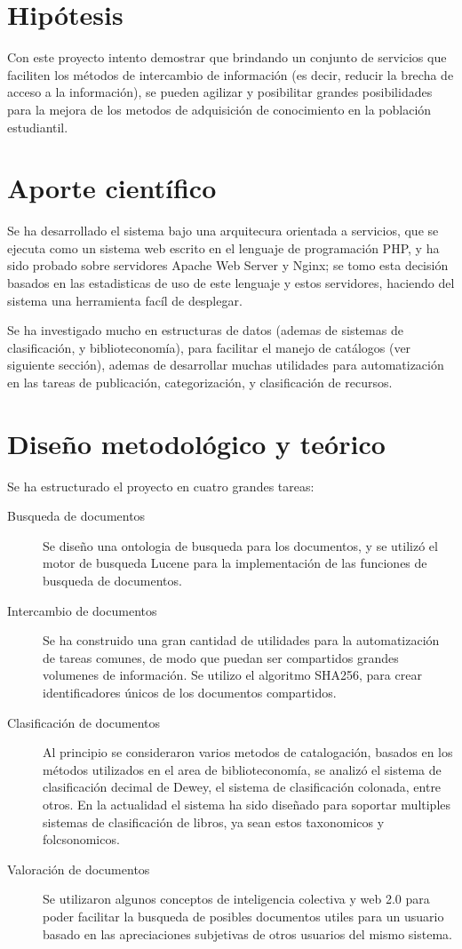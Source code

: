 \documentclass[letter,11pt,oneside,spanish]{article}
\begin{document}
\section{Hipótesis}
Con este proyecto intento demostrar que brindando un conjunto de servicios que
faciliten los métodos de intercambio de información (es decir, reducir la brecha
de acceso a la información), se pueden agilizar y posibilitar grandes
posibilidades para la mejora de los metodos de adquisición de conocimiento en la
población estudiantil.

\section{Aporte científico}
Se ha desarrollado el sistema bajo una arquitecura orientada a servicios, que
se ejecuta como un sistema web escrito en el lenguaje de programación PHP, y ha
sido probado sobre servidores Apache Web Server y Nginx; se tomo esta decisión
basados en las estadisticas de uso de este lenguaje y estos servidores, haciendo
del sistema una herramienta facíl de desplegar.

Se ha investigado mucho en estructuras de datos (ademas de sistemas de
clasificación, y biblioteconomía), para facilitar el manejo de catálogos (ver
siguiente sección), ademas de desarrollar muchas utilidades para automatización
en las tareas de publicación, categorización, y clasificación de recursos.

\section{Diseño metodológico y teórico}
Se ha estructurado el proyecto en cuatro grandes tareas:

\begin{description}
\item [Busqueda de documentos]
    Se diseño una ontologia de busqueda para los documentos, y se utilizó el
    motor de busqueda Lucene para la implementación de las funciones de busqueda
    de documentos.
\item [Intercambio de documentos]
    Se ha construido una gran cantidad de utilidades para la automatización de
    tareas comunes, de modo que puedan ser compartidos grandes volumenes de
    información. Se utilizo el algoritmo SHA256, para crear identificadores
    únicos de los documentos compartidos.
\item [Clasificación de documentos]
    Al principio se consideraron varios metodos de catalogación, basados en los
    métodos utilizados en el area de biblioteconomía, se analizó el sistema de
    clasificación decimal de Dewey, el sistema de clasificación colonada, entre
    otros.
    En la actualidad el sistema ha sido diseñado para soportar multiples
    sistemas de clasificación de libros, ya sean estos taxonomicos y
    folcsonomicos.
\item [Valoración de documentos]
    Se utilizaron algunos conceptos de inteligencia colectiva y web 2.0 para
    poder facilitar la busqueda de posibles documentos utiles para un usuario
    basado en las apreciaciones subjetivas de otros usuarios del mismo sistema.
\end{description}
\end{document}

